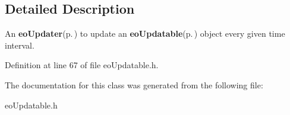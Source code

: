 \subsection{Detailed Description}
An {\bf eo\-Updater}{\rm (p.\,\pageref{classeo_updater})} to update an {\bf eo\-Updatable}{\rm (p.\,\pageref{classeo_updatable})} object every given time interval. 



Definition at line 67 of file eo\-Updatable.h.

The documentation for this class was generated from the following file:\begin{CompactItemize}
\item 
eo\-Updatable.h\end{CompactItemize}
